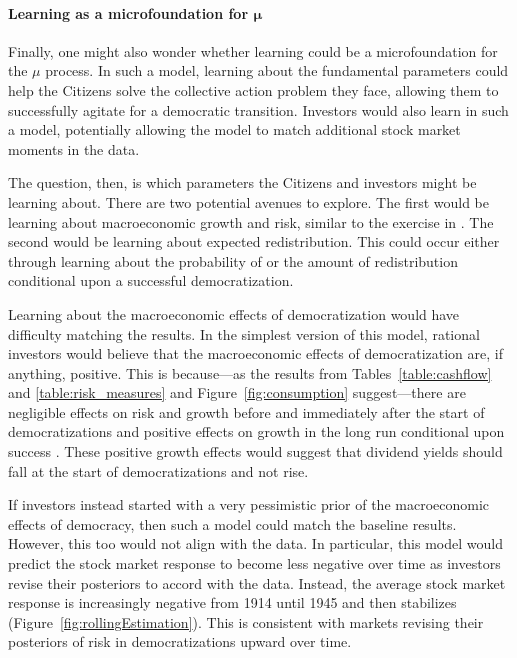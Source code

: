 \paragraph{Learning as a microfoundation for $\boldsymbol \mu$}
\label{par:learning_about_dem}
Finally, one might also wonder whether learning could be a microfoundation for the $\mu$ process.  In such a model, learning about the fundamental parameters could help the Citizens solve the collective action problem they face, allowing them to successfully agitate for a democratic transition. Investors would also learn in such a model, potentially allowing the model to match additional stock market moments in the data.

The question, then, is which parameters the Citizens and investors might be learning about. There are two potential avenues to explore. The first would be learning about macroeconomic growth and risk, similar to the exercise in \cite{Buera2011}. The second would be learning about expected redistribution. This could occur either through learning about the probability of or the amount of redistribution conditional upon a successful democratization.

Learning about the macroeconomic effects of democratization would have difficulty matching the results. In the simplest version of this model, rational investors would believe that the macroeconomic effects of democratization are, if anything, positive.  This is because---as the results from Tables~\ref{table:cashflow} and \ref{table:risk_measures} and Figure~\ref{fig:consumption} suggest---there are negligible effects on risk and growth before and immediately after the start of democratizations and positive effects on growth in the long run conditional upon success \citep{Acemoglu2019}.  These positive growth effects would suggest that dividend yields should fall at the start of democratizations and not rise. 

If investors instead started with a very pessimistic prior of the macroeconomic effects of democracy, then such a model could match the baseline results. However, this too would not align with the data. In particular, this model would predict the stock market response to become less negative over time as investors revise their posteriors to accord with the data. Instead, the average stock market response is increasingly negative from 1914 until 1945 and then stabilizes (Figure~\ref{fig:rollingEstimation}). This is consistent with markets revising their posteriors of risk in democratizations upward over time.

